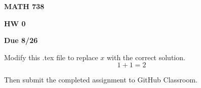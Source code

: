 \documentclass[12pt]{amsart}
\begin{document}
\centerline{\bf MATH 738}
\centerline{\bf HW 0} 
\centerline{\bf Due 8/26}

\vspace{2em}

Modify this .tex file to replace $x$ with the correct solution. 
\begin{displaymath}
    1+1 = 2
\end{displaymath}

Then submit the completed assignment to GitHub Classroom. 
\end{document}
